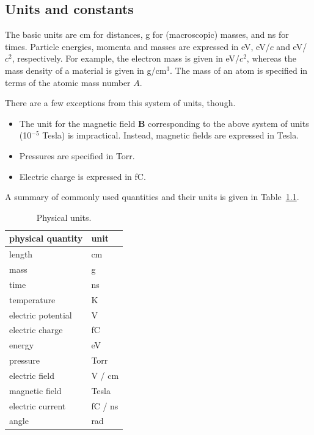 \begin{appendix}
\chapter{Units and constants}

The basic units are cm for distances, g for (macroscopic) masses, 
and ns for times. 
Particle energies, momenta and masses are expressed 
in eV, eV/\(c\) and eV/\(c^{2}\), respectively.
For example, the electron mass is given in eV/\(c^{2}\), 
whereas the mass density of a material is given in g/cm\(^{3}\). 
The mass of an atom is specified in terms of the atomic mass number \(A\).
  
There are a few exceptions from this system of units, though.
\begin{itemize}
  \item
  The unit for the magnetic field \(\mathbf{B}\) corresponding
  to the above system of units (10\(^{-5}\) Tesla) is impractical. 
  Instead, magnetic fields are expressed in Tesla.
  \item
  Pressures are specified in Torr.
  \item
  Electric charge is expressed in fC. 
\end{itemize}
A summary of commonly used quantities and their units is given 
in Table~\ref{Tab:Units}.
\begin{table}
  \centering
  \caption{Physical units.}
  \label{Tab:Units}
  \begin{tabular}{l l}
    \toprule
    physical quantity & unit \\
    \midrule
    length & cm \\
    mass & g \\
    time & ns \\
    temperature & K \\
    electric potential & V \\
    electric charge & fC \\
    \midrule
    energy & eV \\
    pressure & Torr \\
    electric field & V / cm \\
    magnetic field & Tesla \\
    electric current & fC / ns \\
    angle & rad \\
    \bottomrule
  \end{tabular}
\end{table}
  

\end{appendix}
